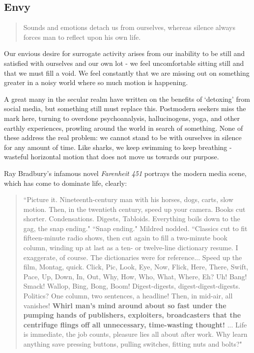 \documentclass[letterpaper]{article}
\begin{document}
\subsection{Envy}

\begin{quote}
  Sounds and emotions detach us from ourselves, whereas silence always forces man to reflect upon his own life.
\end{quote}

Our envious desire for surrogate activity arises from our inability to be still and satisfied with ourselves and our own lot - we feel uncomfortable sitting still and that we must fill a void. We feel constantly that we are missing out on something greater in a noisy world where so much motion is happening.

A great many in the secular realm have written on the benefits of `detoxing' from social media, but something still must replace this. Postmodern seekers miss the mark here, turning to overdone psychoanalysis, hallucinogens, yoga, and other earthly experiences, prowling around the world in search of something. None of these address the real problem: we cannot stand to be with ourselves in silence for any amount of time. Like sharks, we keep swimming to keep breathing - wasteful horizontal motion that does not move us towards our purpose.

Ray Bradbury's infamous novel \textit{Farenheit 451} portrays the modern media scene, which has come to dominate life, clearly:

\begin{quote}
  ``Picture it. Nineteenth-century man with his horses, dogs, carts, slow motion. Then, in the twentieth century, speed up your camera. Books cut shorter. Condensations. Digests, Tabloids. Everything boils down to the gag, the snap ending." ``Snap ending." Mildred nodded. ``Classics cut to fit fifteen-minute radio shows, then cut again to fill a two-minute book column, winding up at last as a ten- or twelve-line dictionary resume. I exaggerate, of course. The dictionaries were for reference... Speed up the film, Montag, quick. Click, Pic, Look, Eye, Now, Flick, Here, There, Swift, Pace, Up, Down, In, Out, Why, How, Who, What, Where, Eh? Uh! Bang! Smack! Wallop, Bing, Bong, Boom! Digest-digests, digest-digest-digests. Politics? One column, two sentences, a headline! Then, in mid-air, all vanishes! \textbf{Whirl man’s mind around about so fast under the pumping hands of publishers, exploiters, broadcasters that the centrifuge flings off all unnecessary, time-wasting thought!} ... Life is immediate, the job counts, pleasure lies all about after work. Why learn anything save pressing buttons, pulling switches, fitting nuts and bolts?"
\end{quote}
\end{document}
